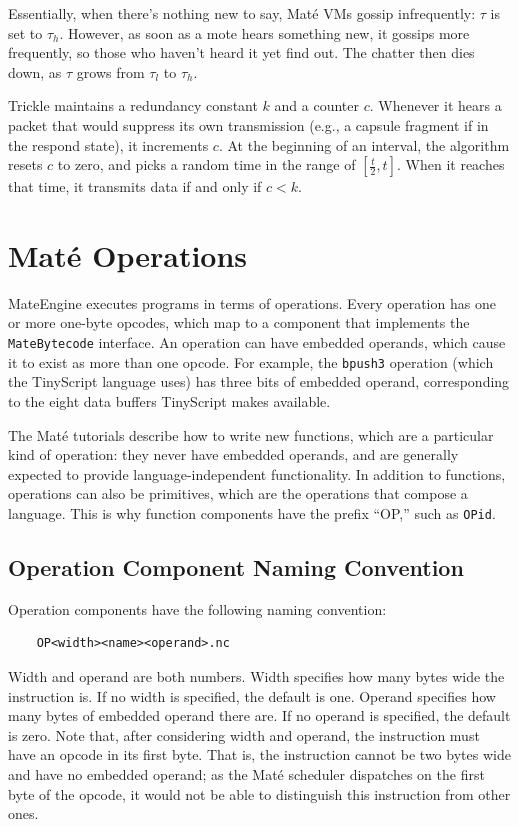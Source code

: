 \documentclass[12pt]{article}
\newcommand{\mate}{Mat\'{e}\xspace}
\begin{document}
Essentially, when there's nothing new to say, \mate VMs gossip
infrequently: $\tau$ is set to $\tau_{h}$. However, as soon as a mote
hears something new, it gossips more frequently, so those who haven't
heard it yet find out. The chatter then dies down, as $\tau$ grows
from $\tau_{l}$ to $\tau_{h}$.

Trickle maintains a redundancy constant $k$ and a counter
$c$. Whenever it hears a packet that would suppress its own
transmission (e.g., a capsule fragment if in the respond state), it
increments $c$. At the beginning of an interval, the algorithm resets
$c$ to zero, and picks a random time in the range of
$[\frac{t}{2},t]$. When it reaches that time, it transmits data if and
only if $c < k$. 

\section{\mate Operations}

MateEngine executes programs in terms of operations. Every operation
has one or more one-byte opcodes, which map to a component that
implements the {\tt MateBytecode} interface. An operation can have
embedded operands, which cause it to exist as more than one
opcode. For example, the {\tt bpush3} operation (which the TinyScript
language uses) has three bits of embedded operand, corresponding to
the eight data buffers TinyScript makes available.

The \mate tutorials describe how to write new functions, which are a
particular kind of operation: they never have embedded operands, and
are generally expected to provide language-independent
functionality. In addition to functions, operations can also be
primitives, which are the operations that compose a language. This is
why function components have the prefix ``OP,'' such as {\tt OPid}.


\subsection{Operation Component Naming Convention}

Operation components have the following naming convention:

{\scriptsize
\begin{verbatim}
    OP<width><name><operand>.nc
\end{verbatim}
}

Width and operand are both numbers. Width specifies how many bytes
wide the instruction is. If no width is specified, the default is
one. Operand specifies how many bytes of embedded operand there
are. If no operand is specified, the default is zero. Note that, after
considering width and operand, the instruction must have an opcode in
its first byte. That is, the instruction cannot be two bytes wide and
have no embedded operand; as the \mate scheduler dispatches on the
first byte of the opcode, it would not be able to distinguish this
instruction from other ones.
\end{document}
